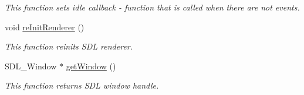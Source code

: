 \begin{DoxyCompactItemize}
\begin{DoxyCompactList}\small\item\em This function sets idle callback -\/ function that is called when there are not events. \end{DoxyCompactList}\item 
\mbox{\label{classWindow_a383e6781d7d6ae31ebbd8a4cc0df88da}} 
void \hyperlink{classWindow_a383e6781d7d6ae31ebbd8a4cc0df88da}{re\+Init\+Renderer} ()
\begin{DoxyCompactList}\small\item\em This function reinits S\+DL renderer. \end{DoxyCompactList}\item 
S\+D\+L\+\_\+\+Window $\ast$ \hyperlink{classWindow_a248f74edd46fe00cb6a2c93bd048c26f}{get\+Window} ()
\begin{DoxyCompactList}\small\item\em This function returns S\+DL window handle. \end{DoxyCompactList}\end{DoxyCompactItemize}
